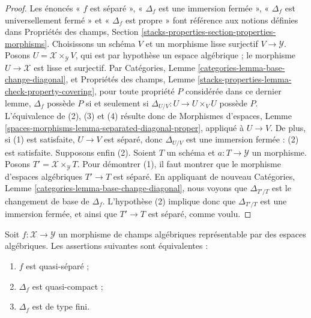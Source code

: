 \begin{proof}
Les énoncés « $f$ est séparé », « $\Delta_f$ est une immersion fermée »,
« $\Delta_f$ est universellement fermé » et « $\Delta_f$ est propre » font
référence aux notions définies dans Propriétés des champs,
Section \ref{stacks-properties-section-properties-morphisms}. Choisissons un
schéma $V$ et un morphisme lisse surjectif $V\to\mathcal{Y}$. Posons
$U=\mathcal{X}\times_\mathcal{Y}V$, qui est par hypothèse un espace
algébrique ; le morphisme $U\to\mathcal{X}$ est lisse et surjectif. Par
Catégories, Lemme \ref{categories-lemma-base-change-diagonal}, et Propriétés
des champs, Lemme \ref{stacks-properties-lemma-check-property-covering}, pour
toute propriété $P$ considérée dans ce dernier lemme, $\Delta_f$ possède $P$
si et seulement si $\Delta_{U/V}:U\to U\times_VU$ possède $P$. L'équivalence
de (2), (3) et (4) résulte donc de Morphismes d'espaces, Lemme
\ref{spaces-morphisms-lemma-separated-diagonal-proper}, appliqué à $U\to V$.
De plus, si (1) est satisfaite, $U\to V$ est séparé, donc
$\Delta_{U/V}$ est une immersion fermée : (2) est satisfaite. Supposons enfin
(2). Soient $T$ un schéma et $a:T\to\mathcal{Y}$ un morphisme. Posons
$T'=\mathcal{X}\times_\mathcal{Y}T$. Pour démontrer (1), il faut montrer que
le morphisme d'espaces algébriques $T'\to T$ est séparé. En appliquant de
nouveau Catégories, Lemme \ref{categories-lemma-base-change-diagonal}, nous
voyons que $\Delta_{T'/T}$ est le changement de base de $\Delta_f$.
L'hypothèse (2) implique donc que $\Delta_{T'/T}$ est une immersion fermée,
et ainsi que $T'\to T$ est séparé, comme voulu.
\end{proof}

\begin{lemma}
\label{lemma-representable-quasi-separated-diagonal-quasi-compact}
Soit $f:\mathcal{X}\to\mathcal{Y}$ un morphisme de champs algébriques
représentable par des espaces algébriques. Les assertions suivantes sont
équivalentes :
\begin{enumerate}
\item $f$ est quasi-séparé ;
\item $\Delta_f$ est quasi-compact ;
\item $\Delta_f$ est de type fini.
\end{enumerate}
\end{lemma}

